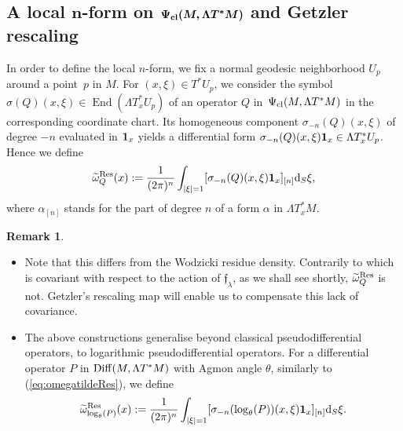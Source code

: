 \documentclass[10pt,a4paper]{amsart}
\numberwithin{equation}{section}
\theoremstyle{definition}
\newtheorem{rk}[thm]{Remark}
\begin{document}
\subsection[A local n-form on Psi\_\{cl\} (M, Lambda T\^{}*M) and Getzler rescaling]{A local $\boldsymbol{n}$-form on $\boldsymbol{\Psi_{\rm cl} (M, \Lambda T^*M)}$ and Getzler rescaling}
In order to define the local $n$-form, we fix a normal geodesic neighborhood $U_p$ around a point~$p$ in $M$. For $(x, \xi)\in T^*U_p$, we consider the symbol $\sigma(Q)(x, \xi) \in \operatorname{End}(\Lambda T_x^*U_p)$ of an operator $Q$ in~$\Psi_{\rm cl}(M, \Lambda T^*M)$ in the corresponding coordinate chart. Its homogeneous component $\sigma_{-n}(Q)(x, \xi)$ of degree $-n$ evaluated in ${\bf 1}_x$ yields a differential form
$\sigma_{-n}(Q)(x, \xi) {\bf 1}_x \in \Lambda T_x^*U_p$. Hence we define
\begin{equation}\label{eq:omegatildeRes}
\widetilde \omega^{\rm Res}_Q(x):= \frac{1}{(2\pi)^n} \int_{|\xi|=1} [ \sigma_{-n} (Q) (x, \xi) {\bf 1}_x ]_{[n]} {\rm d}_S\xi,
\end{equation}
where $\alpha_{[n]}$ stands for the part of degree $n$ of a form $\alpha$ in $\Lambda T_x^*M$.

\begin{rk}\quad
\begin{itemize}\itemsep=0pt
\item Note that this differs from the Wodzicki residue density. Contrarily to  which is covariant with respect to the action of ${\mathfrak f}_{ \lambda}$, as we shall see shortly, $\widetilde \omega^{\rm Res}_Q$ is not. Getzler's rescaling map will enable us to compensate this lack of covariance.
\item The above constructions generalise beyond classical pseudodifferential operators, to logarithmic pseudodifferential operators. For a differential operator $P$ in ${\rm Diff}(M, \Lambda T^* M)$ with Agmon angle $\theta$, similarly to (\ref{eq:omegatildeRes}), we define
\begin{equation*}
\widetilde \omega^{\rm Res}_{\log_\theta(P)}(x):= \frac{1}{(2\pi)^n} \int_{|\xi|=1}[ \sigma_{-n} (\log_\theta (P)) (x, \xi) {\bf 1}_x]_{[n]} {\rm d}_S\xi.
\end{equation*}
\end{itemize}
\end{rk}
\end{document}
